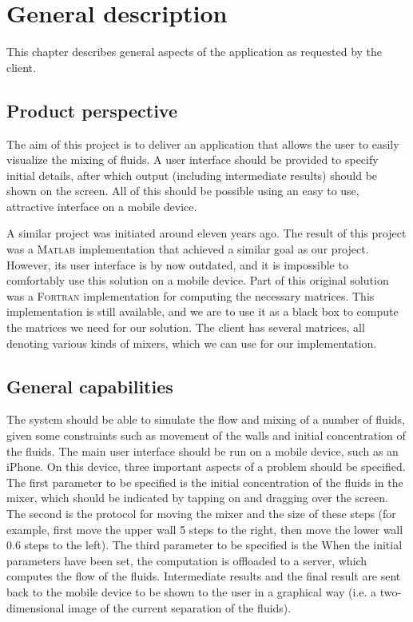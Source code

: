 \chapter{General description}
This chapter describes general aspects of the application as requested by the client.

\section{Product perspective}
The aim of this project is to deliver an application that allows the user to easily visualize the mixing of fluids. A user interface should be provided to specify initial details, after which output (including intermediate results) should be shown on the screen. All of this should be possible using an easy to use, attractive interface on a mobile device.

A similar project was initiated around eleven years ago. The result of this project was a \textsc{Matlab} implementation that achieved a similar goal as our project. However, its user interface is by now outdated, and it is impossible to comfortably use this solution on a mobile device. Part of this original solution was a \textsc{Fortran} implementation for computing the necessary matrices. This implementation is still available, and we are to use it as a black box to compute the matrices we need for our solution. The client has several matrices, all denoting various kinds of mixers, which we can use for our implementation.

\section{General capabilities}
The system should be able to simulate the flow and mixing of a number of fluids, given some constraints such as movement of the walls and initial concentration of the fluids. The main user interface should be run on a mobile device, such as an iPhone. On this device, three important aspects of a problem should be specified. The first parameter to be specified is the initial concentration of the fluids in the mixer, which should be indicated by tapping on and dragging over the screen. The second is the protocol for moving the mixer and the size of these steps (for example, first move the upper wall 5 steps to the right, then move the lower wall 0.6 steps to the left). The third parameter to be specified is the When the initial parameters have been set, the computation is offloaded to a server, which computes the flow of the fluids. Intermediate results and the final result are sent back to the mobile device to be shown to the user in a graphical way (i.e. a two-dimensional image of the current separation of the fluids).

